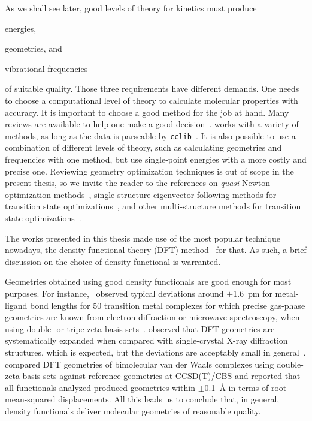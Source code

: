 As we shall see later,
good levels of theory for kinetics
must produce
\begin{enumerate*}
	\item energies,
	\item geometries,
	      and
	\item vibrational frequencies
\end{enumerate*}
of suitable quality.
Those three requirements have different demands.
One needs to choose a computational level of theory to calculate
molecular properties with accuracy.
It is important to choose a good method for the job at hand.
Many reviews are available to help one make a good decision~\cite{Goerigk_2011,Goerigk_2019,Mardirossian_2017,Morgante_2020,Bursch_2022}.
\overreact{} works with a variety of methods,
as long as the data is parseable by \texttt{cclib}~\cite{O_boyle_2008}.
It is also possible to use a combination of different levels of theory,
such as calculating geometries and frequencies with one method,
but use single-point energies with a more costly and precise one.
Reviewing geometry optimization techniques is out of scope in the present
thesis,
so we invite the reader to the references
on \emph{quasi}-Newton optimization methods~\cite{Banerjee_1985,Schlegel_1987},
single-structure eigenvector-following methods for transition state optimizations~\cite{Banerjee_1985,Schlegel_1987,Mauro_2005},
and other multi-structure methods for transition state optimizations~\cite{Peng_1993,Peng_1996}.

The works presented in this thesis made use of the most popular technique nowadays,
the density functional theory (DFT)
method~\cite{Hohenberg_1964,Kohn_1965,Perdew_2014,Kryachko_2014,Yu_2016} for
that.
As such,
a brief discussion on the choice of density functional is warranted.

Geometries obtained using good density functionals are good enough
for most purposes.
For instance,~\citeauthor{Bühl_2006} observed typical deviations around $\pm$1.6~pm for
metal-ligand bond lengths for 50 transition metal complexes for which precise gas-phase geometries
are known from electron diffraction or microwave spectroscopy,
when using double- or tripe-zeta basis sets~\cite{Bühl_2006}.
\citeauthor{Minenkov_2012} observed that
DFT geometries are systematically expanded when compared with single-crystal
X-ray diffraction structures,
which is expected,
but the deviations are
acceptably small in general~\cite{Minenkov_2012}.
\citeauthor{Sirianni_2018} compared DFT geometries of bimolecular van der Waals complexes using
double-zeta basis sets against reference geometries at CCSD(T)/CBS
and reported that all functionals analyzed produced
geometries within $\pm$0.1~\AA{} in terms
of root-mean-squared displacements.
All this leads us to conclude that,
in general,
density functionals deliver molecular geometries of reasonable quality.

